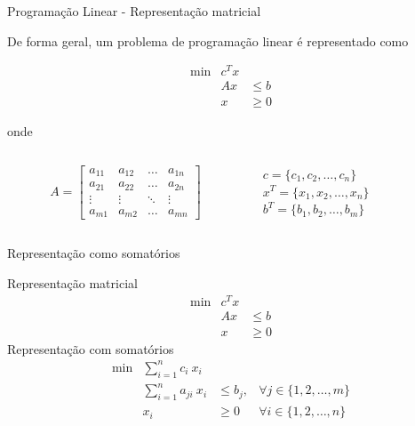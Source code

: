 \documentclass[compress,mathserif]{beamer}
\begin{document}
\begin{frame}{Programação Linear - Representação matricial}

De forma geral, um problema de programação linear é representado como

  $$\begin{matrix}
        \min & c^Tx \\ 
             & Ax & \leqslant b \\
             & x & \geqslant 0 
        \end{matrix}    
$$

onde 
\begin{columns}[T]
    \begin{column}{.49\textwidth}
    $$A = \begin{bmatrix}
a_{11} & a_{12} & \dots & a_{1n}\\ 
a_{21} & a_{22} & \dots & a_{2n}\\ 
\vdots & \vdots & \ddots & \vdots \\ 
a_{m1} & a_{m2} & \dots & a_{mn}
\end{bmatrix}$$
\end{column}
    \begin{column}{.49\textwidth}
    \vspace{0.55cm}
    $c = \{c_1, c_2, \ldots, c_n\}$ \\
    \vspace{0.25cm}
    $x^T = \{x_1, x_2, \ldots, x_n\}$ \\
    \vspace{0.25cm}
    $b^T = \{b_1, b_2, \ldots, b_m\}$
    \end{column}
\end{columns}
\end{frame}


\begin{frame}{Representação como somatórios}


Representação matricial
    $$\begin{matrix}
        \min & c^Tx \\ 
             & Ax & \leqslant b \\
             & x & \geqslant 0 
        \end{matrix}    
$$
Representação com somatórios
    $$\begin{matrix}
        \min & \sum_{i = 1}^n c_i~x_i \\      & \sum_{i = 1}^n a_{ji}~x_i & \leqslant b_j, & \forall j \in \{1, 2, \ldots, m\}  \\
             & x_i & \geqslant 0 & \forall i \in \{1, 2, \ldots, n \}
        \end{matrix}    
$$
\end{frame}
\end{document}

